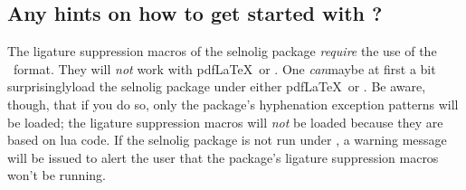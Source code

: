 \documentclass[12pt]{article}
\newcommand{\pkg}[1]{\textsf{#1}}
\begin{document}
\subsection{Any hints on how to get started with \LuaLaTeX?}

The ligature suppression macros of the \pkg{selnolig} package \emph{require} the use of the \LuaLaTeX\ format. They will \emph{not} work with pdf\LaTeX\ or \XeLaTeX. One \emph{can}\textemdash maybe at first a bit surprisingly\textemdash load the \pkg{selnolig} package under either pdf\LaTeX\ or \XeLaTeX. Be aware, though, that if you do so, only the package's hyphenation exception patterns will be loaded; the ligature suppression macros will \emph{not} be loaded because they are based on lua code. If the \pkg{selnolig} package is not run under \LuaLaTeX, a warning message will be issued to alert the user that the package's ligature suppression macros won't be running.
\end{document}
